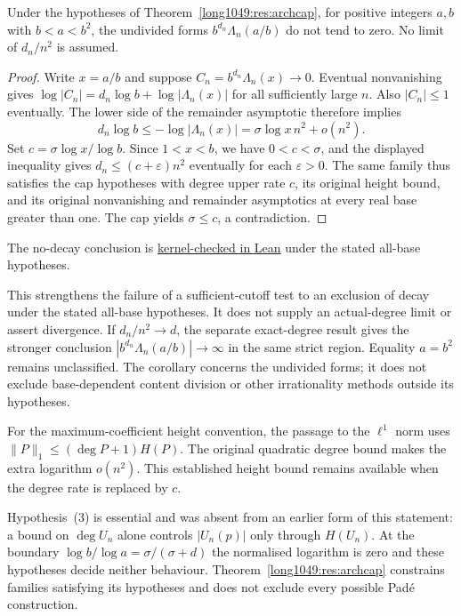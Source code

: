 \documentclass[11pt]{article}
\begin{document}
\begin{corollary}
\label{long1049:cor:no-decay-below-square}
Under the hypotheses of Theorem~\ref{long1049:res:archcap}, for positive integers
$a,b$ with $b<a<b^2$, the undivided forms $b^{d_n}\Lambda_n(a/b)$ do not
tend to zero.  No limit of $d_n/n^2$ is assumed.
\end{corollary}
\begin{proof}
Write $x=a/b$ and suppose $C_n=b^{d_n}\Lambda_n(x)\to0$.
Eventual nonvanishing gives
$\log|C_n|=d_n\log b+\log|\Lambda_n(x)|$ for all sufficiently large $n$.
Also $|C_n|\le1$ eventually.  The lower side of the remainder asymptotic
therefore implies
\[
 d_n\log b\le-\log|\Lambda_n(x)|
       =\sigma\log x\,n^2+o(n^2).
\]
Set $c=\sigma\log x/\log b$.  Since $1<x<b$, we have $0<c<\sigma$,
and the displayed inequality gives $d_n\le(c+\varepsilon)n^2$ eventually
for each $\varepsilon>0$.  The same family thus satisfies the cap hypotheses
with degree upper rate $c$, its original height bound, and its original
nonvanishing and remainder asymptotics at every real base greater than one.
The cap yields $\sigma\le c$, a contradiction.
\end{proof}
\noindent The no-decay conclusion is \href{https://github.com/wcook04/plectis-erdos/blob/3be82b1a7340284aea72e9a5c8493cb020843921/ErdosProblems/Erdos1049/PaperNoDecayR9.lean#L69}{kernel-checked in Lean} under the stated all-base hypotheses.


This strengthens the failure of a sufficient-cutoff test to an exclusion
of decay under the stated all-base hypotheses.  It does not supply an
actual-degree limit or assert divergence.  If $d_n/n^2\to d$, the separate
exact-degree result gives the stronger conclusion
$|b^{d_n}\Lambda_n(a/b)|\to\infty$ in the same strict region.
Equality $a=b^2$ remains unclassified.  The corollary concerns the undivided
forms; it does not exclude base-dependent content division or other
irrationality methods outside its hypotheses.

For the maximum-coefficient height convention, the passage to the
$\ell^1$ norm uses $\|P\|_1\le(\deg P+1)H(P)$.  The original quadratic
degree bound makes the extra logarithm $o(n^2)$.  This established height
bound remains available when the degree rate is replaced by $c$.



\noindent Hypothesis~(3) is essential and was absent from an earlier form of
this statement: a bound on $\deg U_n$ alone controls $|U_n(p)|$ only through
$H(U_n)$.  At the boundary $\log b/\log a=\sigma/(\sigma+d)$ the normalised
logarithm is zero and these hypotheses decide neither behaviour.
Theorem~\ref{long1049:res:archcap} constrains families satisfying its hypotheses and
does not exclude every possible Pad\'e construction.
\end{document}
